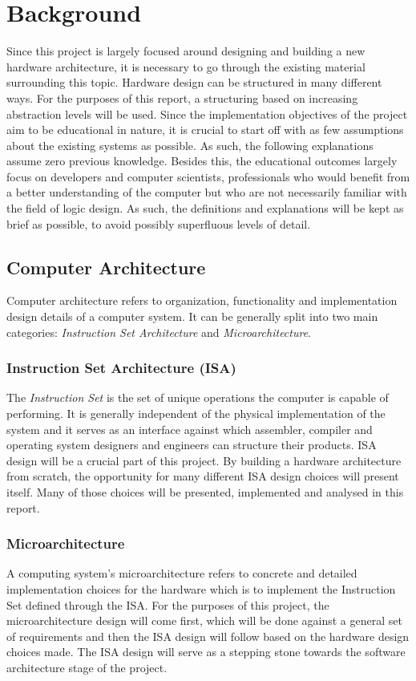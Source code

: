\chapter{Background}
Since this project is largely focused around designing and building a new hardware architecture,
it is necessary to go through the existing material surrounding this topic. Hardware design can
be structured in many different ways. For the purposes of this report, a structuring based on increasing
abstraction levels will be used. Since the implementation objectives of the project aim to be educational in nature,
it is crucial to start off with as few assumptions about the existing systems as possible. As such, the following explanations assume zero previous knowledge. Besides this, the educational outcomes largely focus on developers and computer scientists, professionals who would benefit from a better understanding of the computer but who are not necessarily familiar with the field of logic design. As such, the definitions and explanations will be kept as brief as possible, to avoid possibly superfluous levels of detail.

\section{Computer Architecture}
Computer architecture refers to organization, functionality and implementation design details of a computer system. It can be generally split into two main categories: \emph{Instruction Set Architecture} and \emph{Microarchitecture}.

\subsection{Instruction Set Architecture (ISA)}
The \emph{Instruction Set} is the set of unique operations the computer is capable of performing. It is generally independent of the physical implementation of the system and it serves as an interface against which assembler, compiler and operating system designers and engineers can structure their products. ISA design will be a crucial part of this project. By building a hardware architecture from scratch, the opportunity for many different ISA design choices will present itself. Many of those choices will be presented, implemented and analysed in this report.

\subsection{Microarchitecture}
A computing system's microarchitecture refers to concrete and detailed implementation choices for the hardware which is to implement the Instruction Set defined through the ISA. For the purposes of this project, the microarchitecture design will come first, which will be done against a general set of requirements and then the ISA design will follow based on the hardware design choices made. The ISA design will serve as a stepping stone towards the software architecture stage of the project.

